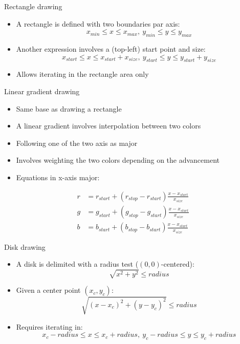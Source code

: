\begin{frame}{Rectangle drawing}
  \begin{itemize}
  \item A rectangle is defined with two boundaries par axis:
\[
x_{min} \leq x \leq x_{max},~ y_{min} \leq y \leq y_{max}
\]
  \item Another expression involves a (top-left) start point and size:
\[
x_{start} \leq x \leq x_{start} + x_{size},~ y_{start} \leq y \leq y_{start} + y_{size}
\]
  \item Allows iterating in the rectangle area only
  \end{itemize}
\end{frame}

\begin{frame}{Linear gradient drawing}
  \begin{itemize}
  \item Same base as drawing a rectangle
  \item A linear gradient involves interpolation between two colors
  \item Following one of the two axis as major
  \item Involves weighting the two colors depending on the advancement
  \item Equations in x-axis major:
  \end{itemize}
\begin{align*}
r &= r_{start} + (r_{stop} - r_{start}) \frac{x - x_{start}}{x_{size}}\\
g &= g_{start} + (g_{stop} - g_{start}) \frac{x - x_{start}}{x_{size}}\\
b &= b_{start} + (b_{stop} - b_{start}) \frac{x - x_{start}}{x_{size}}
\end{align*}
\end{frame}

\begin{frame}{Disk drawing}
  \begin{itemize}
  \item A disk is delimited with a radius test (\((0,0)\)-centered):
\[
\sqrt{x^2 + y^2} \leq radius
\]
  \item Given a center point \((x_c,y_c)\):
\[
\sqrt{(x - x_c)^2 + (y - y_c)^2} \leq radius
\]
  \item Requires iterating in:
\[
x_c - radius \leq x \leq x_c + radius,~ y_c - radius \leq y \leq y_c + radius
\]
  \end{itemize}
\end{frame}

